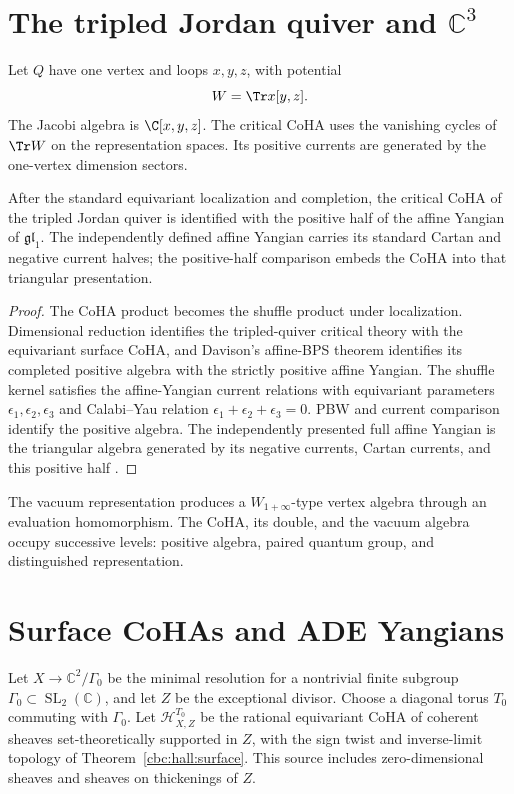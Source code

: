 \chapter{The tripled Jordan quiver and \texorpdfstring{$\mathbb C^3$}{C3}}
Let $Q$ have one vertex and loops $x,y,z$, with potential
\[
 W=\Tr x[y,z].
\]
The Jacobi algebra is $\C[x,y,z]$. The critical CoHA uses the vanishing cycles of $\Tr W$ on the representation spaces. Its positive currents are generated by the one-vertex dimension sectors.

\begin{theorem}
After the standard equivariant localization and completion, the critical CoHA of the tripled Jordan quiver is identified with the positive half of the affine Yangian of $\mathfrak{gl}_1$. The independently defined affine Yangian carries its standard Cartan and negative current halves; the positive-half comparison embeds the CoHA into that triangular presentation.
\end{theorem}
\begin{proof}
The CoHA product becomes the shuffle product under localization. Dimensional reduction identifies the tripled-quiver critical theory with the equivariant surface CoHA, and Davison's affine-BPS theorem identifies its completed positive algebra with the strictly positive affine Yangian. The shuffle kernel satisfies the affine-Yangian current relations with equivariant parameters $\epsilon_1,\epsilon_2,\epsilon_3$ and Calabi--Yau relation $\epsilon_1+\epsilon_2+\epsilon_3=0$. PBW and current comparison identify the positive algebra. The independently presented full affine Yangian is the triangular algebra generated by its negative currents, Cartan currents, and this positive half \cite{DavisonAffineBPS,DavisonMeinhardt,SVYangians,Tsymbaliuk}.
\end{proof}

The vacuum representation produces a $W_{1+\infty}$-type vertex algebra through an evaluation homomorphism. The CoHA, its double, and the vacuum algebra occupy successive levels: positive algebra, paired quantum group, and distinguished representation.

\chapter{Surface CoHAs and ADE Yangians}
Let $X\to\mathbb C^2/\Gamma_0$ be the minimal resolution for a nontrivial finite subgroup $\Gamma_0\subset\operatorname{SL}_2(\mathbb C)$, and let $Z$ be the exceptional divisor.
Choose a diagonal torus $T_0$ commuting with $\Gamma_0$.
Let $\mathcal H^{T_0}_{X,Z}$ be the rational equivariant CoHA of coherent sheaves set-theoretically supported in $Z$, with the sign twist and inverse-limit topology of Theorem~\ref{cbc:hall:surface}.
This source includes zero-dimensional sheaves and sheaves on thickenings of $Z$.

